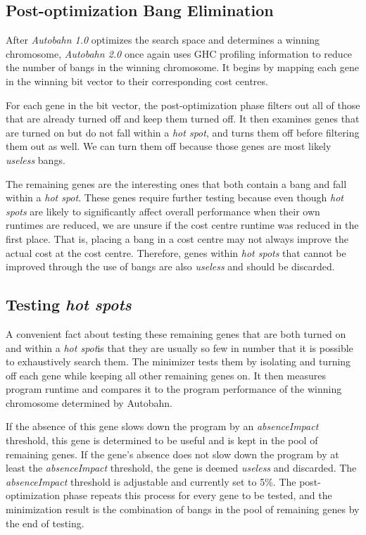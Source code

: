 \documentclass[format=sigplan]{acmart}
\newcommand{\hotspot}[0]{\textit{hot spot}}
\newcommand{\hotspots}[0]{\textit{hot spots}}
\newcommand{\useless}[0]{\textit{useless}}
\newcommand{\Ao}[0]{\textit{Autobahn 1.0}}
\newcommand{\At}[0]{\textit{Autobahn 2.0}}
\newcommand{\postopt}[0]{post-optimization}
\newcommand{\Postopt}[0]{Post-optimization}
\newcommand{\absim}[0]{\textit{absenceImpact}}
\begin{document}
\subsection{\Postopt{} Bang Elimination}

After \Ao{} optimizes the search space and determines a winning chromosome, \At{} once again uses GHC profiling information to reduce the number of bangs in the winning chromosome. It begins by mapping each gene in the winning bit vector to their corresponding cost centres. 

For each gene in the bit vector, the \postopt{} phase filters out all of those that are already turned off and keep them turned off. It then examines genes that are turned on but do not fall within a \hotspot{}, and turns them off before filtering them out as well. We can turn them off because those genes are most likely \useless{} bangs. 

The remaining genes are the interesting ones that both contain a bang and fall within a \hotspot{}. These genes require further testing because even though \hotspots{} are likely to significantly affect overall performance when their own runtimes are reduced, we are unsure if the cost centre runtime was reduced in the first place. That is, placing a bang in a cost centre may not always improve the actual cost at the cost centre. Therefore, genes within \hotspots{} that cannot be improved through the use of bangs are also \useless{} and should be discarded.

\subsection{Testing \hotspots{}}
 
A convenient fact about testing these remaining genes that are both turned on and within a \hotspot is that they are usually so few in number that it is possible to exhaustively search them. The minimizer tests them by isolating and turning off each gene while keeping all other remaining genes on. It then measures program runtime and compares it to the program performance of the winning chromosome determined by Autobahn. 

If the absence of this gene slows down the program by an \absim{} threshold, this gene is determined to be useful and is kept in the pool of remaining genes. If the gene's absence does not slow down the program by at least the \absim{} threshold, the gene is deemed \useless{} and discarded. The \absim{} threshold is adjustable and currently set to 5\%. The \postopt{} phase repeats this process for every gene to be tested, and the minimization result is the combination of bangs in the pool of remaining genes by the end of testing.
\end{document}

